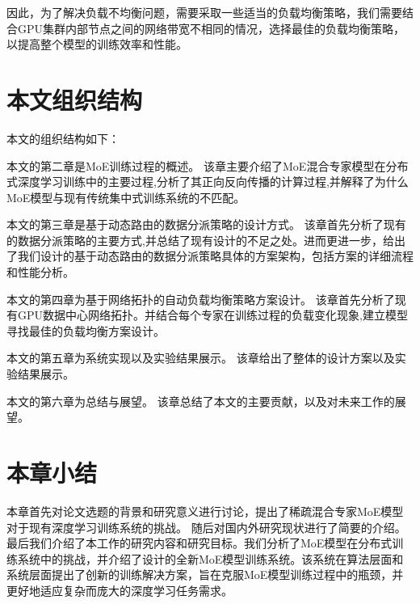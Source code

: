 因此，为了解决负载不均衡问题，需要采取一些适当的负载均衡策略，我们需要结合GPU集群内部节点之间的网络带宽不相同的情况，选择最佳的负载均衡策略，以提高整个模型的训练效率和性能。

\section{本文组织结构}

本文的组织结构如下：

本文的第二章是MoE训练过程的概述。
% 
该章主要介绍了MoE混合专家模型在分布式深度学习训练中的主要过程,分析了其正向反向传播的计算过程,并解释了为什么MoE模型与现有传统集中式训练系统的不匹配。

本文的第三章是基于动态路由的数据分派策略的设计方式。
%
该章首先分析了现有的数据分派策略的主要方式,并总结了现有设计的不足之处。进而更进一步，给出了我们设计的基于动态路由的数据分派策略具体的方案架构，包括方案的详细流程和性能分析。


本文的第四章为基于网络拓扑的自动负载均衡策略方案设计。
%
该章首先分析了现有GPU数据中心网络拓扑。并结合每个专家在训练过程的负载变化现象,建立模型寻找最佳的负载均衡方案设计。


本文的第五章为系统实现以及实验结果展示。
%
该章给出了整体的设计方案以及实验结果展示。

本文的第六章为总结与展望。
%
该章总结了本文的主要贡献，以及对未来工作的展望。


\section{本章小结}

本章首先对论文选题的背景和研究意义进行讨论，提出了稀疏混合专家MoE模型对于现有深度学习训练系统的挑战。
%
随后对国内外研究现状进行了简要的介绍。
最后我们介绍了本工作的研究内容和研究目标。我们分析了MoE模型在分布式训练系统中的挑战，并介绍了设计的全新MoE模型训练系统。该系统在算法层面和系统层面提出了创新的训练解决方案，旨在克服MoE模型训练过程中的瓶颈，并更好地适应复杂而庞大的深度学习任务需求。
\endinput